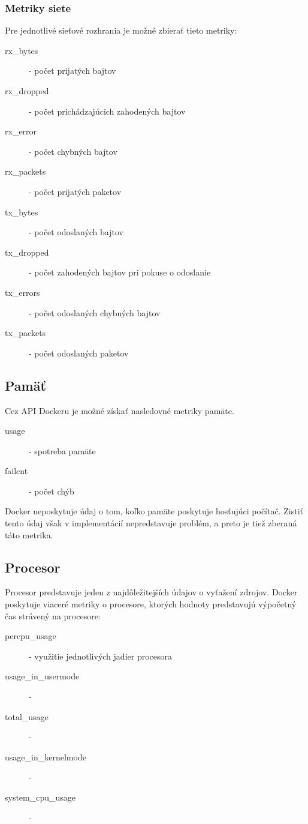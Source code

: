 \documentclass[11pt,final,oneside]{fithesis}
\begin{document}
\subsubsection{Metriky siete}
Pre jednotlivé sieťové rozhrania je možné zbierať tieto metriky:
\begin{description}
\item[rx\_bytes] - počet prijatých bajtov
\item[rx\_dropped] - počet prichádzajúcich zahodených bajtov
\item[rx\_error] - počet chybných bajtov
\item[rx\_packets] - počet prijatých paketov
\item[tx\_bytes] - počet odoslaných bajtov
\item[tx\_dropped] - počet zahodených bajtov pri pokuse o odoslanie
\item[tx\_errors] - počet odoslaných chybných bajtov
\item[tx\_packets] - počet odoslaných paketov
\end{description}

\subsection{Pamäť}
Cez API Dockeru je možné získať nasledovné metriky pamäte.
\begin{description}
\item[usage] - spotreba pamäte
\item[failcnt] - počet chýb
\end{description}
Docker neposkytuje údaj o tom, koľko pamäte poskytuje hosťujúci počítač. Zistiť tento údaj však v implementácií nepredstavuje problém,
a preto je tiež zberaná táto metrika.

\subsection{Procesor}
Procesor predstavuje jeden z najdôležitejších údajov o vyťažení zdrojov. Docker poskytuje viaceré metriky o procesore, ktorých hodnoty 
predstavujú výpočetný čas strávený na procesore: 
\begin{description}
\item[percpu\_usage] - využitie jednotlivých jadier procesora
\item[usage\_in\_usermode] - 
\item[total\_usage] - 
\item[usage\_in\_kernelmode] - 
\item[system\_cpu\_usage] - 
\end{description}
\end{document}
